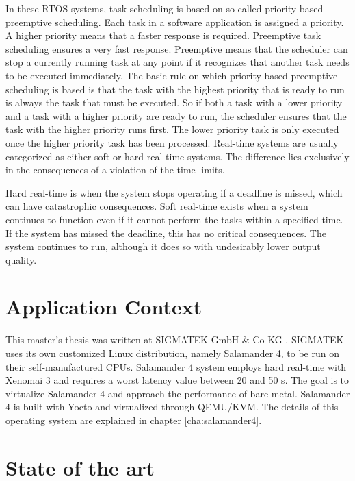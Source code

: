\documentclass[MMR,Master,english]{twbook}
\begin{document}
\bigskip \noindent In these RTOS systems, task scheduling is based on so-called priority-based preemptive scheduling. Each task in a software application is assigned a priority. A higher priority means that a faster response is required. Preemptive task scheduling ensures a very fast response. Preemptive means that the scheduler can stop a currently running task at any point if it recognizes that another task needs to be executed immediately. The basic rule on which priority-based preemptive scheduling is based is that the task with the highest priority that is ready to run is always the task that must be executed. So if both a task with a lower priority and a task with a higher priority are ready to run, the scheduler ensures that the task with the higher priority runs first. The lower priority task is only executed once the higher priority task has been processed. Real-time systems are usually categorized as either soft or hard real-time systems. The difference lies exclusively in the consequences of a violation of the time limits.

\bigskip \noindent Hard real-time is when the system stops operating if a deadline is missed, which can have catastrophic consequences. Soft real-time exists when a system continues to function even if it cannot perform the tasks within a specified time. If the system has missed the deadline, this has no critical consequences. The system continues to run, although it does so with undesirably lower output quality.

\clearpage
\section{Application Context}
This master's thesis was written at SIGMATEK GmbH \& Co KG \cite{pixelartSIGMATEKKompletteAutomatisierungssysteme}.
SIGMATEK uses its own customized Linux distribution, namely Salamander 4, to be run on their self-manufactured CPUs. Salamander 4 system employs hard real-time with Xenomai 3 and requires a worst latency value between 20 and 50 \textmu s. The goal is to virtualize Salamander 4 and approach the performance of bare metal. Salamander 4 is built with Yocto and virtualized through QEMU/KVM. The details of this operating system are explained in chapter \ref{cha:salamander4}. 

\section{State of the art}
\end{document}
